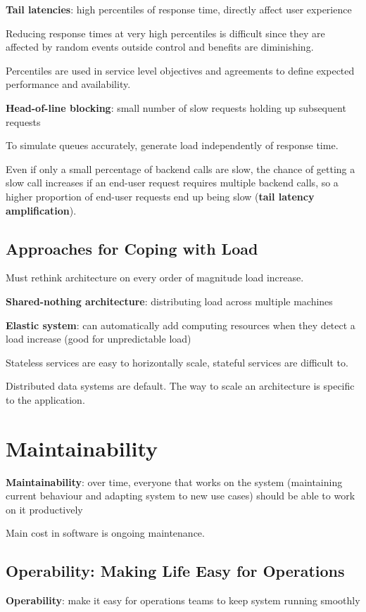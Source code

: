 \documentclass[11pt]{article}
\begin{document}
\textbf{Tail latencies}: high percentiles of response time, directly affect user
experience

Reducing response times at very high percentiles is difficult since they are
affected by random events outside control and benefits are diminishing.

Percentiles are used in service level objectives and agreements to define
expected performance and availability.

\textbf{Head-of-line blocking}: small number of slow requests holding up subsequent
requests

To simulate queues accurately, generate load independently of response time.

Even if only a small percentage of backend calls are slow, the chance of
getting a slow call increases if an end-user request requires multiple
backend calls, so a higher proportion of end-user requests end up being
slow (\textbf{tail latency amplification}).
\subsection{Approaches for Coping with Load}
\label{sec:org41d1747}
Must rethink architecture on every order of magnitude load increase.

\textbf{Shared-nothing architecture}: distributing load across
multiple machines

\textbf{Elastic system}: can automatically add computing resources when
they detect a load increase (good for unpredictable load)

Stateless services are easy to horizontally scale, stateful
services are difficult to.

Distributed data systems are default.
The way to scale an architecture is specific to the application.
\section{Maintainability}
\label{sec:org5a145f7}
\textbf{Maintainability}: over time, everyone that works on the system (maintaining current behaviour
and adapting system to new use cases) should be able to work on it productively

Main cost in software is ongoing maintenance.
\subsection{Operability: Making Life Easy for Operations}
\label{sec:orgfd97c11}
\textbf{Operability}: make it easy for operations teams to keep system running smoothly
\end{document}
